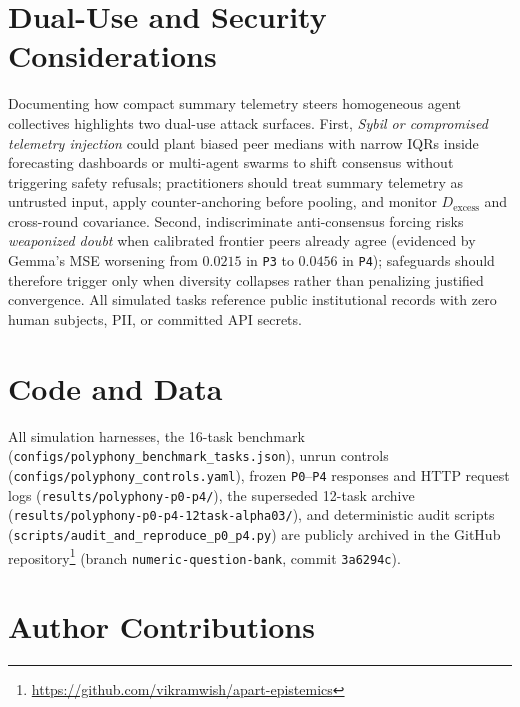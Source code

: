 \documentclass[11pt,letterpaper]{article}
\theoremstyle{plain}
\newcommand{\code}[1]{\nolinkurl{#1}}
\begin{document}
\section{Dual-Use and Security Considerations}

Documenting how compact summary telemetry steers homogeneous agent collectives highlights two dual-use attack surfaces. First, \emph{Sybil or compromised telemetry injection} could plant biased peer medians with narrow IQRs inside forecasting dashboards or multi-agent swarms to shift consensus without triggering safety refusals; practitioners should treat summary telemetry as untrusted input, apply counter-anchoring before pooling, and monitor $D_{\text{excess}}$ and cross-round covariance. Second, indiscriminate anti-consensus forcing risks \emph{weaponized doubt} when calibrated frontier peers already agree (evidenced by Gemma's MSE worsening from $0.0215$ in \texttt{P3} to $0.0456$ in \texttt{P4}); safeguards should therefore trigger only when diversity collapses rather than penalizing justified convergence. All simulated tasks reference public institutional records with zero human subjects, PII, or committed API secrets.

\section{Code and Data}

All simulation harnesses, the 16-task benchmark (\code{configs/polyphony\_benchmark\_tasks.json}), unrun controls (\code{configs/polyphony\_controls.yaml}), frozen \texttt{P0}--\texttt{P4} responses and HTTP request logs (\code{results/polyphony-p0-p4/}), the superseded 12-task archive (\code{results/polyphony-p0-p4-12task-alpha03/}), and deterministic audit scripts (\code{scripts/audit\_and\_reproduce\_p0\_p4.py}) are publicly archived in the GitHub repository\footnote{\url{https://github.com/vikramwish/apart-epistemics}} (branch \code{numeric-question-bank}, commit \texttt{3a6294c}).

\section{Author Contributions}
\end{document}
